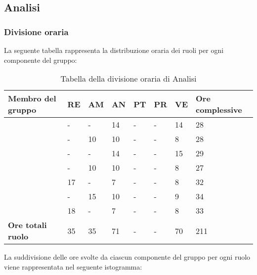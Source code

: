\subsection{Analisi}

\subsubsection{Divisione oraria}
La seguente tabella rappresenta la distribuzione oraria dei ruoli per ogni componente del gruppo:
{

\renewcommand{\arraystretch}{2}
\begin{longtable}[h!] { C{4cm} C{1cm} C{1cm} C{1cm} C{1cm} C{1cm} C{1cm} C{3cm}}
\caption{Tabella della divisione oraria di Analisi}	\\
\rowcolor{\primaryColor}

\textcolor{\secondaryColor}{\textbf{Membro del gruppo}} & 
\textcolor{\secondaryColor}{\textbf{RE}} & 
\textcolor{\secondaryColor}{\textbf{AM}} & 
\textcolor{\secondaryColor}{\textbf{AN}} & 
\textcolor{\secondaryColor}{\textbf{PT}} & 
\textcolor{\secondaryColor}{\textbf{PR}} & 
\textcolor{\secondaryColor}{\textbf{VE}} & 
\textcolor{\secondaryColor}{\textbf{Ore complessive}}\\	
\endhead
\AW{}                     &  - &  - &  14 & - & - & 14 & 28 \\
\AT{}                     &  - &  10 & 10 & - & - & 8 & 28 \\
\AD{}                     &  - &  - &  14 & - & - & 15 & 29 \\
\EC{}                     &  - &  10 & 10 & - & - & 8 & 27 \\
\EM{}                     &  17 &  - & 7 & - & - & 8 & 32 \\
\FP{}                     &  - &  15 & 10 & - & - & 9 & 34 \\
\GG{}                     & 18 &  - &  7 & - & - & 8 & 33 \\
\textbf{Ore totali ruolo} & 35 & 35 & 71 & - & - & 70 & 211 \\

\end{longtable}
}
La suddivisione delle ore svolte da ciascun componente del gruppo per ogni ruolo viene rappresentata nel seguente istogramma:
